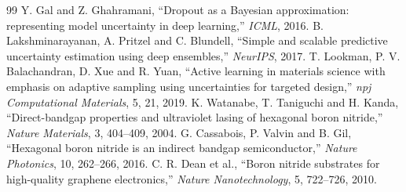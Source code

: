 \documentclass[10pt,a4paper]{article}
\begin{document}
\begin{thebibliography}{99}
 Y. Gal and Z. Ghahramani, ``Dropout as a Bayesian approximation: representing model uncertainty in deep learning,'' \textit{ICML}, 2016.
 B. Lakshminarayanan, A. Pritzel and C. Blundell, ``Simple and scalable predictive uncertainty estimation using deep ensembles,'' \textit{NeurIPS}, 2017.
 T. Lookman, P. V. Balachandran, D. Xue and R. Yuan, ``Active learning in materials science with emphasis on adaptive sampling using uncertainties for targeted design,'' \textit{npj Computational Materials}, 5, 21, 2019.
 K. Watanabe, T. Taniguchi and H. Kanda, ``Direct-bandgap properties and ultraviolet lasing of hexagonal boron nitride,'' \textit{Nature Materials}, 3, 404--409, 2004.
 G. Cassabois, P. Valvin and B. Gil, ``Hexagonal boron nitride is an indirect bandgap semiconductor,'' \textit{Nature Photonics}, 10, 262--266, 2016.
 C. R. Dean et al., ``Boron nitride substrates for high-quality graphene electronics,'' \textit{Nature Nanotechnology}, 5, 722--726, 2010.
\end{thebibliography}
\normalsize
\end{document}
